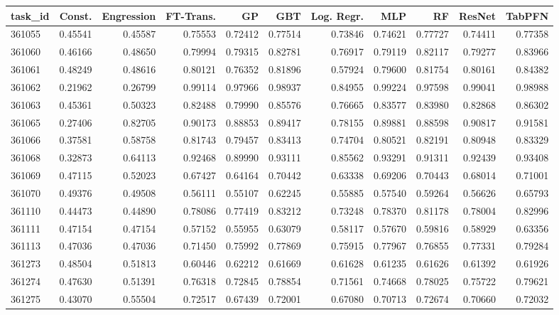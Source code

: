 \begin{tabular}{lrrrrrrrrrr}
\toprule
task\_id & Const. & Engression & FT-Trans. & GP & GBT & Log. Regr. & MLP & RF & ResNet & TabPFN \\
\midrule
361055 & 0.45541 & 0.45587 & 0.75553 & 0.72412 & 0.77514 & 0.73846 & 0.74621 & 0.77727 & 0.74411 & 0.77358 \\
361060 & 0.46166 & 0.48650 & 0.79994 & 0.79315 & 0.82781 & 0.76917 & 0.79119 & 0.82117 & 0.79277 & 0.83966 \\
361061 & 0.48249 & 0.48616 & 0.80121 & 0.76352 & 0.81896 & 0.57924 & 0.79600 & 0.81754 & 0.80161 & 0.84382 \\
361062 & 0.21962 & 0.26799 & 0.99114 & 0.97966 & 0.98937 & 0.84955 & 0.99224 & 0.97598 & 0.99041 & 0.98988 \\
361063 & 0.45361 & 0.50323 & 0.82488 & 0.79990 & 0.85576 & 0.76665 & 0.83577 & 0.83980 & 0.82868 & 0.86302 \\
361065 & 0.27406 & 0.82705 & 0.90173 & 0.88853 & 0.89417 & 0.78155 & 0.89881 & 0.88598 & 0.90817 & 0.91581 \\
361066 & 0.37581 & 0.58758 & 0.81743 & 0.79457 & 0.83413 & 0.74704 & 0.80521 & 0.82191 & 0.80948 & 0.83329 \\
361068 & 0.32873 & 0.64113 & 0.92468 & 0.89990 & 0.93111 & 0.85562 & 0.93291 & 0.91311 & 0.92439 & 0.93408 \\
361069 & 0.47115 & 0.52023 & 0.67427 & 0.64164 & 0.70442 & 0.63338 & 0.69206 & 0.70443 & 0.68014 & 0.71001 \\
361070 & 0.49376 & 0.49508 & 0.56111 & 0.55107 & 0.62245 & 0.55885 & 0.57540 & 0.59264 & 0.56626 & 0.65793 \\
361110 & 0.44473 & 0.44890 & 0.78086 & 0.77419 & 0.83212 & 0.73248 & 0.78370 & 0.81178 & 0.78004 & 0.82996 \\
361111 & 0.47154 & 0.47154 & 0.57152 & 0.55955 & 0.63079 & 0.58117 & 0.57670 & 0.59816 & 0.58929 & 0.63356 \\
361113 & 0.47036 & 0.47036 & 0.71450 & 0.75992 & 0.77869 & 0.75915 & 0.77967 & 0.76855 & 0.77331 & 0.79284 \\
361273 & 0.48504 & 0.51813 & 0.60446 & 0.62212 & 0.61669 & 0.61628 & 0.61235 & 0.61626 & 0.61392 & 0.61926 \\
361274 & 0.47630 & 0.51391 & 0.76318 & 0.72845 & 0.78854 & 0.71561 & 0.74668 & 0.78025 & 0.75722 & 0.79621 \\
361275 & 0.43070 & 0.55504 & 0.72517 & 0.67439 & 0.72001 & 0.67080 & 0.70713 & 0.72674 & 0.70660 & 0.72032 \\

\end{tabular}
